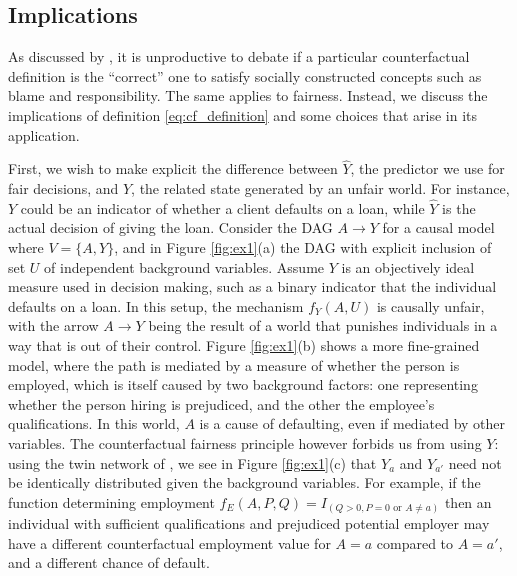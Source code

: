 \subsection{Implications}
%
As discussed by \citet{halpern:16}, it is unproductive to debate
if a particular counterfactual definition is the ``correct'' one
to satisfy socially constructed concepts such as blame and responsibility.
The same applies to fairness. Instead, we discuss the
implications of definition \eqref{eq:cf_definition} and some choices
that arise in its application.

First, we wish to make explicit the difference between $\hat Y$, the
predictor we use for fair decisions, and $Y$, the related state
generated by an unfair world. For instance, $Y$ could be an indicator
of whether a client defaults on a loan, while $\hat Y$ is the actual
decision of giving the loan. Consider the DAG $A \rightarrow Y$ for a
causal model where $V = \{A, Y\}$, and in Figure \ref{fig:ex1}(a) the
DAG with explicit inclusion of set $U$ of independent background
variables. Assume $Y$ is an objectively ideal measure used in decision
making, such as a binary indicator that the individual defaults on a
loan. In this setup, the mechanism $f_Y(A, U)$ is causally unfair,
with the arrow $A \rightarrow Y$ being the result of a world that
punishes individuals in a way that is out of their control. Figure
\ref{fig:ex1}(b) shows a more fine-grained model, where the path is
mediated by a measure of whether the person is employed, which is
itself caused by two background factors: one representing whether the
person hiring is prejudiced, and the other the employee's
qualifications. %
In this world,
$A$ is a cause of defaulting, even if mediated by other
variables. The counterfactual fairness principle however forbids us
from using $Y$: using the twin network of
\citet{pearl:00}, we see in Figure \ref{fig:ex1}(c) that $Y_a$ and
$Y_{a'}$ need not be identically distributed given the
background variables.
For example, if the function determining employment
$f_E(A,P,Q) = I_{(Q > 0, P = 0 \text{ or } A \neq a)}$ then an individual
with sufficient qualifications and prejudiced potential employer
may have a different counterfactual
employment value for $A = a$ compared to $A = a'$, and a different chance of default.


